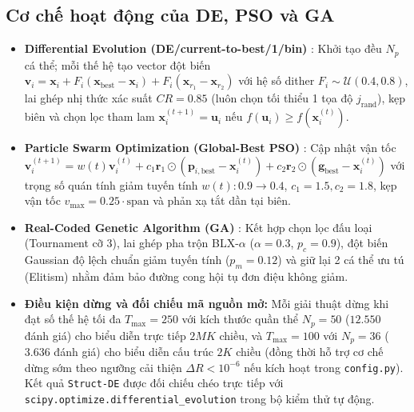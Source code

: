 \documentclass[12pt, a4paper]{article}
\begin{document}
\subsection{Cơ chế hoạt động của DE, PSO và GA}
\begin{itemize}
    \item \textbf{Differential Evolution (DE/current-to-best/1/bin)} \cite{storn1997}: Khởi tạo đều $N_p$ cá thể; mỗi thế hệ tạo vector đột biến $\mathbf{v}_i = \mathbf{x}_i + F_i(\mathbf{x}_{\text{best}} - \mathbf{x}_i) + F_i(\mathbf{x}_{r_1} - \mathbf{x}_{r_2})$ với hệ số dither $F_i \sim \mathcal{U}(0.4, 0.8)$, lai ghép nhị thức xác suất $CR = 0.85$ (luôn chọn tối thiểu 1 tọa độ $j_{\text{rand}}$), kẹp biên và chọn lọc tham lam $\mathbf{x}_i^{(t+1)} = \mathbf{u}_i$ nếu $f(\mathbf{u}_i) \ge f(\mathbf{x}_i^{(t)})$.
    \item \textbf{Particle Swarm Optimization (Global-Best PSO)} \cite{kennedy1995, shi1998}: Cập nhật vận tốc $\mathbf{v}_i^{(t+1)} = w(t)\mathbf{v}_i^{(t)} + c_1 \mathbf{r}_1 \odot (\mathbf{p}_{i,\text{best}} - \mathbf{x}_i^{(t)}) + c_2 \mathbf{r}_2 \odot (\mathbf{g}_{\text{best}} - \mathbf{x}_i^{(t)})$ với trọng số quán tính giảm tuyến tính $w(t): 0.9 \to 0.4$, $c_1 = 1.5, c_2 = 1.8$, kẹp vận tốc $v_{\max} = 0.25 \cdot \text{span}$ và phản xạ tắt dần tại biên.
    \item \textbf{Real-Coded Genetic Algorithm (GA)} \cite{goldberg1989}: Kết hợp chọn lọc đấu loại (Tournament cỡ 3), lai ghép pha trộn BLX-$\alpha$ ($\alpha = 0.3$, $p_c = 0.9$), đột biến Gaussian độ lệch chuẩn giảm tuyến tính ($p_m = 0.12$) và giữ lại 2 cá thể ưu tú (Elitism) nhằm đảm bảo đường cong hội tụ đơn điệu không giảm.
    \item \textbf{Điều kiện dừng và đối chiếu mã nguồn mở:} Mỗi giải thuật dừng khi đạt số thế hệ tối đa $T_{\max} = 250$ với kích thước quần thể $N_p = 50$ ($12.550$ đánh giá) cho biểu diễn trực tiếp $2MK$ chiều, và $T_{\max} = 100$ với $N_p = 36$ ($3.636$ đánh giá) cho biểu diễn cấu trúc $2K$ chiều (đồng thời hỗ trợ cơ chế dừng sớm theo ngưỡng cải thiện $\Delta R < 10^{-6}$ nếu kích hoạt trong \texttt{config.py}). Kết quả \texttt{Struct-DE} được đối chiếu chéo trực tiếp với \texttt{scipy.optimize.differential\_evolution} \cite{virtanen2020} trong bộ kiểm thử tự động.
\end{itemize}
\end{document}
